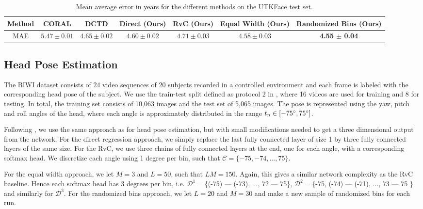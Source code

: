 \documentclass[10pt, conference, a4paper]{IEEEtran}
\begin{document}
\begin{table*}[t]
\vspace{0.1in}
\renewcommand{\arraystretch}{1.3}
\caption{Mean average error in years for the different methods on the UTKFace \cite{zhifei2017cvpr} test set.}
\label{utkresults}
\centering
\begin{tabular}{c c c c c c c}
\hline
Method & CORAL \cite{cao2019rank}   & DCTD \cite{gustafsson2019dctd} & Direct (Ours) & RvC (Ours) & Equal Width (Ours) & Randomized Bins (Ours)\\
\hline
MAE & $5.47 \pm 0.01$ & $4.65 \pm 0.02$      & $4.60 \pm 0.02$ & $4.71 \pm 0.03$            & $4.58 \pm 0.03$ & \textbf{4.55 $\pm$ 0.04}             \\
\hline
\end{tabular}
\end{table*}


\subsection{Head Pose Estimation}
The BIWI dataset \cite{eth_biwi_00839} consists of 24 video sequences of 20 subjects recorded in a controlled environment and each frame is labeled with the corresponding head pose of the subject. We use the train-test split defined as protocol 2 in \cite{yang2019fsa}, where 16 videos are used for training and 8 for testing. In total, the training set consists of 10,063 images and the test set of 5,065 images. The pose is represented using the yaw, pitch and roll angles of the head, where each angle is approximately distributed in the range $t_n \in [-75 \degree, 75 \degree]$.

Following \cite{gustafsson2019dctd}, we use the same approach as for head pose estimation, but with small modifications needed to get a three dimensional output from the network. For the direct regression approach, we simply replace the last fully connected layer of size 1 by three fully connected layers of the same size. For the RvC, we use three chains of fully connected layers at the end, one for each angle, with a corresponding softmax head. We discretize each angle using 1 degree per bin, such that $\mathcal{C} = \{-75, -74, ..., 75\}$.

For the equal width approach, we let $M = 3$ and $L = 50$, such that $LM = 150$. Again, this gives a similar network complexity as the RvC baseline. Hence each softmax head has 3 degrees per bin, i.e. $\mathcal{D}^1 = $\{(-75) --- (-73), ..., 72 --- 75\}, $\mathcal{D}^2 = $\{-75, (-74) --- (-71), ..., 73 --- 75 \} and similarly for $\mathcal{D}^3$. For the randomized bins approach, we let $L = 20$ and $M = 30$ and make a new sample of randomized bins for each run. 
\end{document}
